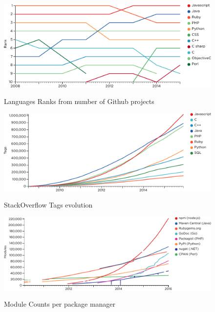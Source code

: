 
\begin{figure}[h!]
  \centering
  \includegraphics[width=\linewidth]{../resources/github-languages.pdf}
  \label{fig:github-languages}
  \caption{Languages Ranks from number of Github projects}
\end{figure}

\begin{figure}[h!]
  \centering
  \includegraphics[width=\linewidth]{../resources/stackoverflow-tags.pdf}
  \label{fig:so-tags}
  \caption{StackOverflow Tags evolution}
\end{figure}

\begin{figure}[h!]
  \centering
  \includegraphics[width=\linewidth]{../resources/modulecounts.pdf}
  \label{fig:modulecounts}
  \caption{Module Counts per package manager}    
\end{figure}

